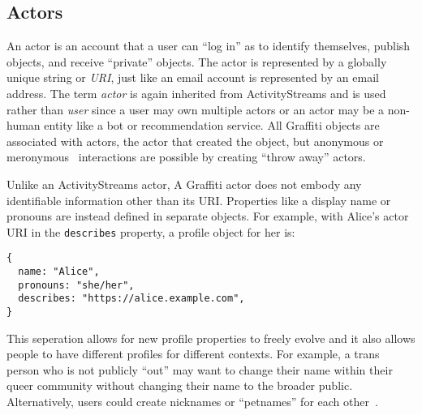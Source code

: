 \subsection{Actors}
\label{concepts:actors}

An actor is an account that a user can ``log in'' as
to identify themselves, publish objects, and receive ``private'' objects.
The actor is represented by a globally unique string or \emph{URI},
just like an email account is represented by an email address.
The term \emph{actor} is again inherited from ActivityStreams
and is used rather than \emph{user} since a user may own
multiple actors or
an actor may be a non-human entity
like a bot or recommendation service.
All Graffiti objects are associated with actors, the actor
that created the object, but anonymous
or meronymous~\cite{meronymous} interactions are possible by
creating ``throw away'' actors.




Unlike an ActivityStreams actor, A Graffiti actor does not embody any identifiable information other than its
URI.
Properties like a display name or pronouns are instead
defined in separate objects.
For example, with Alice's actor URI in the \texttt{describes}
property, a profile object for her is:
\begin{verbatim}
{
  name: "Alice",
  pronouns: "she/her",
  describes: "https://alice.example.com",
}
\end{verbatim}
This seperation allows for new profile
properties to freely evolve
and it also allows people to have different profiles for different contexts.
For example, a trans person who is not publicly ``out'' may want to
change their name within their queer community without
changing their name to the broader public.
Alternatively, users could create nicknames
or ``petnames'' for each other~\cite{petnames}.

